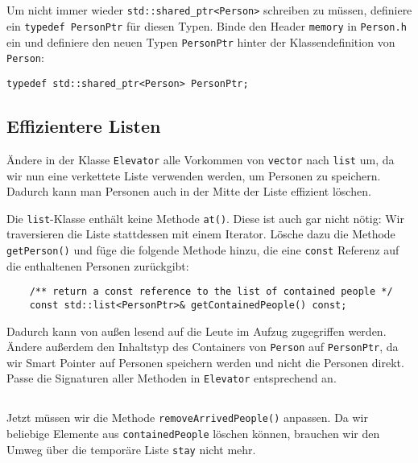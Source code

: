 \subsection{}
Um nicht immer wieder \texttt{std::shared\_ptr<Person>} schreiben zu müssen, definiere ein \texttt{typedef PersonPtr} für diesen Typen.
Binde den Header \texttt{memory} in \texttt{Person.h} ein und definiere den neuen Typen \texttt{PersonPtr} hinter der Klassendefinition von \texttt{Person}:

\begin{lstlisting}
typedef std::shared_ptr<Person> PersonPtr;
\end{lstlisting}

\subsection{Effizientere Listen}
Ändere in der Klasse \texttt{Elevator} alle Vorkommen von \texttt{vector} nach \texttt{list} um, da wir nun eine verkettete Liste verwenden werden, um Personen zu speichern.
Dadurch kann man Personen auch in der Mitte der Liste effizient löschen.

Die \texttt{list}-Klasse enthält keine Methode \texttt{at()}.
Diese ist auch gar nicht nötig:
Wir traversieren die Liste stattdessen mit einem Iterator.
Lösche dazu die Methode \texttt{getPerson()} und füge die folgende Methode hinzu, die eine \texttt{const} Referenz auf die enthaltenen Personen zurückgibt:

\begin{lstlisting}
	/** return a const reference to the list of contained people */
	const std::list<PersonPtr>& getContainedPeople() const;
\end{lstlisting}

Dadurch kann von außen lesend auf die Leute im Aufzug zugegriffen werden.
Ändere außerdem den Inhaltstyp des Containers von \texttt{Person} auf \texttt{PersonPtr}, da wir Smart Pointer auf Personen speichern werden und nicht die Personen direkt.
Passe die Signaturen aller Methoden in \texttt{Elevator} entsprechend an.

\subsection{}
Jetzt müssen wir die Methode \texttt{removeArrivedPeople()} anpassen.
Da wir beliebige Elemente aus \texttt{containedPeople} löschen können, brauchen wir den Umweg über die temporäre Liste \texttt{stay} nicht mehr.

